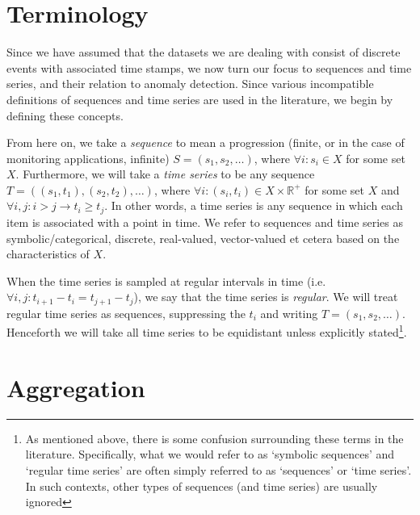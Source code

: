\section{Terminology}
\label{sect:terminology}

Since we have assumed that the datasets we are dealing with consist of discrete events with associated time stamps, we now turn our focus to sequences and time series, and their relation to anomaly detection. Since various incompatible definitions of sequences and time series are used in the literature, we begin by defining these concepts.

From here on, we take a \emph{sequence} to mean a progression (finite, or in the case of monitoring applications, infinite) $S = (s_1, s_2, \dots)$, where $\forall i: s_i \in X$ for some set $X$. Furthermore, we will take a \emph{time series} to be any sequence $T = ((s_1, t_1), (s_2, t_2), \dots)$, where $\forall i: (s_i, t_i) \in X \times \mathbb{R}^+$ for some set $X$ and $\forall i, j: i > j \rightarrow t_i \geq t_j$. In other words, a time series is any sequence in which each item is associated with a point in time. We refer to sequences and time series as symbolic/categorical, discrete, real-valued, vector-valued et cetera based on the characteristics of $X$.

When the time series is sampled at regular intervals in time (i.e.\ $\forall i, j: t_{i+1} - t_i = t_{j+1} - t_j$), we say that the time series is \emph{regular}. We will treat regular time series as sequences, suppressing the $t_i$ and writing $T = (s_1, s_2, \dots)$. Henceforth we will take all time series to be equidistant unless explicitly stated\footnote{As mentioned above, there is some confusion surrounding these terms in the literature. Specifically, what we would refer to as `symbolic sequences' and `regular time series' are often simply referred to as `sequences' or `time series'. In such contexts, other types of sequences (and time series) are usually ignored}.

\section{Aggregation}
\label{sect:aggregation}

